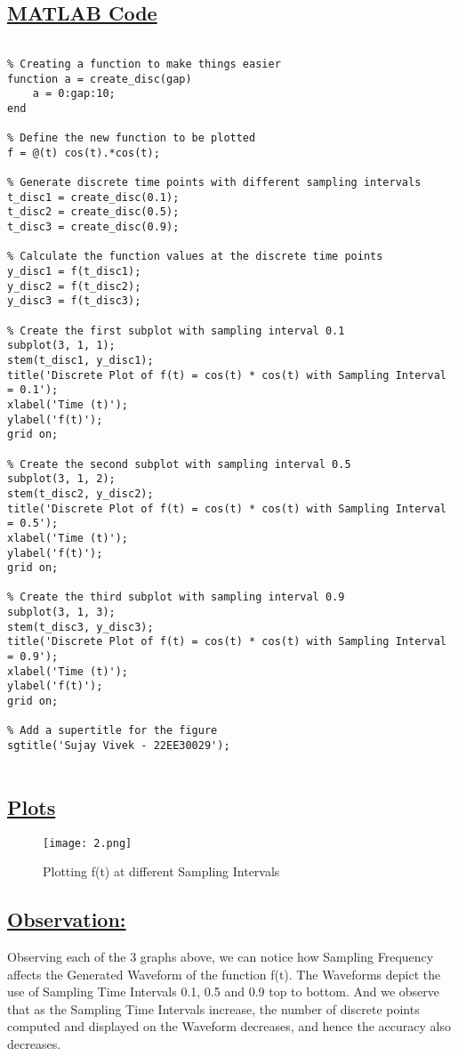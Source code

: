 \documentclass[a4paper,12pt,fleqn]{article}
\begin{document}
\subsection*{\underline{MATLAB Code}}
\begin{lstlisting}

% Creating a function to make things easier
function a = create_disc(gap)
    a = 0:gap:10;
end

% Define the new function to be plotted
f = @(t) cos(t).*cos(t);

% Generate discrete time points with different sampling intervals
t_disc1 = create_disc(0.1);
t_disc2 = create_disc(0.5);
t_disc3 = create_disc(0.9);

% Calculate the function values at the discrete time points
y_disc1 = f(t_disc1);
y_disc2 = f(t_disc2);
y_disc3 = f(t_disc3);

% Create the first subplot with sampling interval 0.1
subplot(3, 1, 1); 
stem(t_disc1, y_disc1);
title('Discrete Plot of f(t) = cos(t) * cos(t) with Sampling Interval = 0.1');
xlabel('Time (t)');
ylabel('f(t)');
grid on;

% Create the second subplot with sampling interval 0.5
subplot(3, 1, 2); 
stem(t_disc2, y_disc2);
title('Discrete Plot of f(t) = cos(t) * cos(t) with Sampling Interval = 0.5');
xlabel('Time (t)');
ylabel('f(t)');
grid on;

% Create the third subplot with sampling interval 0.9
subplot(3, 1, 3); 
stem(t_disc3, y_disc3);
title('Discrete Plot of f(t) = cos(t) * cos(t) with Sampling Interval = 0.9');
xlabel('Time (t)');
ylabel('f(t)');
grid on;

% Add a supertitle for the figure
sgtitle('Sujay Vivek - 22EE30029');


\end{lstlisting}
\FloatBarrier
\newpage
\subsection*{\underline{Plots}}
\begin{figure}[h]
        \centering
        \texttt{[image: 2.png]}
        \caption{Plotting f(t) at different Sampling Intervals}
        \label{fig:enter-label}
\end{figure}

\subsection*{\underline{Observation:}}
Observing each of the 3 graphs above, we can notice how Sampling Frequency affects the Generated Waveform of the function f(t). 
The Waveforms depict the use of Sampling Time Intervals 0.1, 0.5 and 0.9 top to bottom. And we observe that as the Sampling Time Intervals increase, the number of discrete points computed and displayed on the Waveform decreases, and hence the accuracy also decreases.
\end{document}
